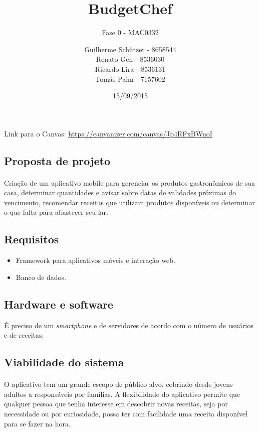 \documentclass[a4paper]{article}
\title{\textbf{BudgetChef}}
\subtitle{Fase 0 - MAC0332}
\author{
	Guilherme Schützer - 8658544\\
	Renato Geh - 8536030\\
	Ricardo Lira - 8536131\\
	Tomás Paim - 7157602\\
}
\date{15/09/2015}
\begin{document}
\maketitle

Link para o Canvas: \url{https://canvanizer.com/canvas/Jp4RFxBWnoI}

\subsection{Proposta de projeto}

\paragraph{} Criação de um aplicativo mobile para gerenciar os produtos gastronômicos de sua casa, determinar quantidades e avisar sobre datas de validades próximas do vencimento, recomendar receitas que utilizam produtos disponíveis ou determinar o que falta para abastecer seu lar.

\subsection{Requisitos}

\begin{itemize}

\item Framework para aplicativos móveis e interação web.
\item Banco de dados.

\end{itemize}

\subsection{Hardware e software}

É preciso de um \emph{smartphone} e de servidores de acordo com o número de usuários e de receitas.

\subsection{Viabilidade do sistema}

\paragraph{} O aplicativo tem um grande escopo de público alvo, cobrindo desde jovens adultos a responsáveis por famílias. A flexibilidade do aplicativo permite que qualquer pessoa que tenha interesse em descobrir novas receitas, seja por necessidade ou por curiosidade, possa ter com facilidade uma receita disponível para se fazer na hora.
\end{document}
